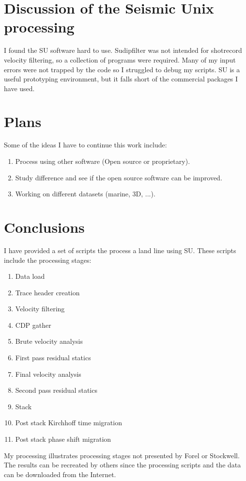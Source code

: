 \section{Discussion of the Seismic Unix processing}
I found the SU software hard to use.  Sudipfilter was not intended for 
shotrecord velocity filtering, so a collection of programs were required.  
Many of my input errors were not trapped by the code so I struggled to 
debug my scripts.  SU is a useful prototyping environment, but it falls 
short of the commercial packages I have used.

\section{Plans}
Some of the ideas I have to continue this work include:

\begin{enumerate}
\item Process using other software (Open source or proprietary). 
\item Study difference and see if the open source software can be improved.
\item Working on different datasets (marine, 3D, ...).
\end{enumerate}

\section{Conclusions}
I have provided a set of scripts the process a land line using SU.  These scripts include the processing stages:

\begin{enumerate}
\item Data load
\item Trace header creation
\item Velocity filtering 
\item CDP gather
\item Brute velocity analysis
\item First pass residual statics
\item Final velocity analysis
\item Second pass residual statics
\item Stack
\item Post stack Kirchhoff time migration
\item Post stack phase shift migration
\end{enumerate}

My processing illustrates processing stages not presented by Forel
or Stockwell. The results can be recreated by others since the processing
scripts and the data can be downloaded from the Internet.

